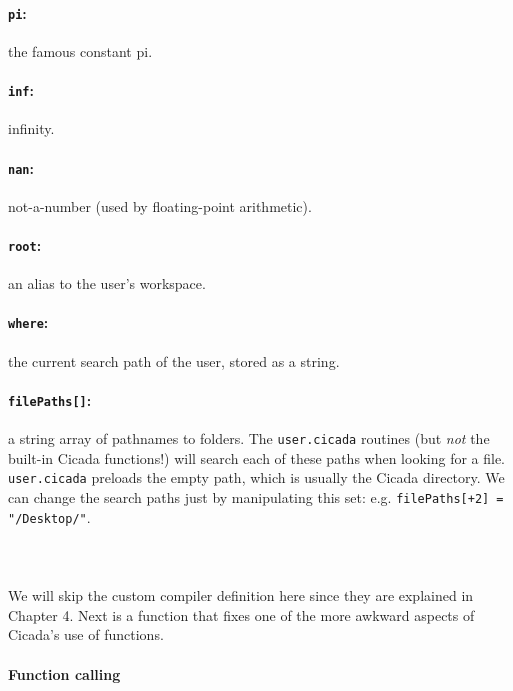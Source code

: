 \documentclass{article}
\begin{document}
\paragraph{\texttt{pi}:}  the famous constant pi.

\paragraph{\texttt{inf}:}  infinity.

\paragraph{\texttt{nan}:}  not-a-number (used by floating-point arithmetic).

\paragraph{\texttt{root}:}  an alias to the user's workspace.

\paragraph{\texttt{where}:}  the current search path of the user, stored as a string.

\paragraph{\texttt{filePaths[]}:}  a string array of pathnames to folders.  The \verb#user.cicada# routines (but \emph{not} the built-in Cicada functions!) will search each of these paths when looking for a file.  \verb#user.cicada# preloads the empty path, which is usually the Cicada directory.  We can change the search paths just by manipulating this set:  e.g. \verb#filePaths[+2] = "/Desktop/"#.\\\\\\\\


We will skip the custom compiler definition here since they are explained in Chapter 4.  Next is a function that fixes one of the more awkward aspects of Cicada's use of functions.\\




\paragraph{Function calling}
\end{document}
